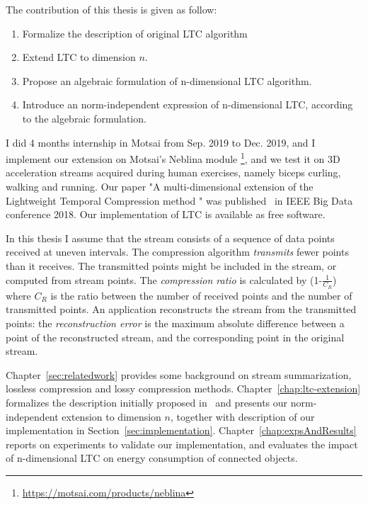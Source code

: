 The contribution of this thesis is given as follow:
\begin{enumerate}
  \item Formalize the description of original LTC algorithm
  \item Extend LTC to dimension $n$.
  \item Propose an algebraic formulation of n-dimensional LTC algorithm.
  \item Introduce an norm-independent expression of n-dimensional LTC, according to
  the algebraic formulation.
\end{enumerate}


I did 4 months internship in Motsai from Sep. 2019 to Dec. 2019, and I implement
our extension on  Motsai's Neblina module
\footnote{\url{https://motsai.com/products/neblina}}, and we test it on 3D
acceleration streams acquired during human exercises, namely biceps curling,
walking and  running. Our paper "A multi-dimensional extension of the
Lightweight Temporal Compression method " was published~\cite{li2018multi} in
IEEE Big Data conference 2018. Our implementation of LTC is available as free
software.



In this thesis I assume that the stream consists of a sequence of data points
received at uneven intervals. The compression algorithm  \emph{transmits} fewer
points than it receives. The transmitted points  might be included in the
stream, or computed from stream points. The  \emph{compression ratio} is
calculated by (1-$\frac{1}{C_R}$) where $C_R$ is the ratio between the number of
received points and the number of transmitted points. An application
reconstructs the stream from the transmitted points: the  \emph{reconstruction
error} is the maximum absolute difference between  a point of the reconstructed
stream, and the corresponding  point in the original stream.


Chapter~\ref{sec:relatedwork} provides some background on stream summarization,
lossless compression and lossy compression methods.
Chapter~\ref{chap:ltc-extension} formalizes the description initially proposed
in~\cite{schoellhammer2004lightweight} and presents our norm-independent
extension to dimension $n$, together with description of our implementation in
Section~\ref{sec:implementation}. Chapter~\ref{chap:expsAndResults} reports on
experiments to validate our  implementation, and evaluates the impact of
n-dimensional LTC on  energy consumption of connected objects.





